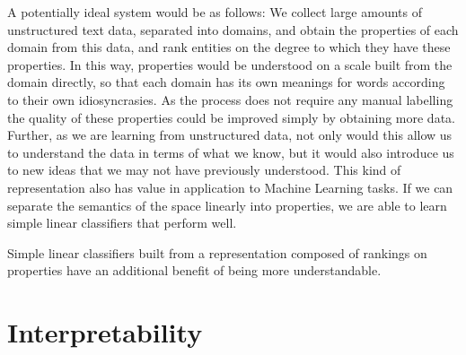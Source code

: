 A potentially ideal system would be as follows: We collect large amounts of unstructured text data, separated into domains, and obtain the properties of each domain from this data, and rank entities on the degree to which they have these properties. In this way, properties would be understood on a scale built from the domain directly, so that each domain has its own meanings for words according to their own idiosyncrasies. As the process does not require any manual labelling the quality of these properties could be improved simply by obtaining more data. Further, as we are learning from unstructured data, not only would this allow us to understand the data in terms of what we know, but it would also introduce us to new ideas that we may not have previously understood. This kind of representation also has value in application to Machine Learning tasks. If we can separate the semantics of the space linearly into properties, we are able to learn simple linear classifiers that perform well. 

Simple linear classifiers built from a representation composed of rankings on properties have an additional benefit of being more understandable.







%

\section{Interpretability}\label{ch1:interpret}


